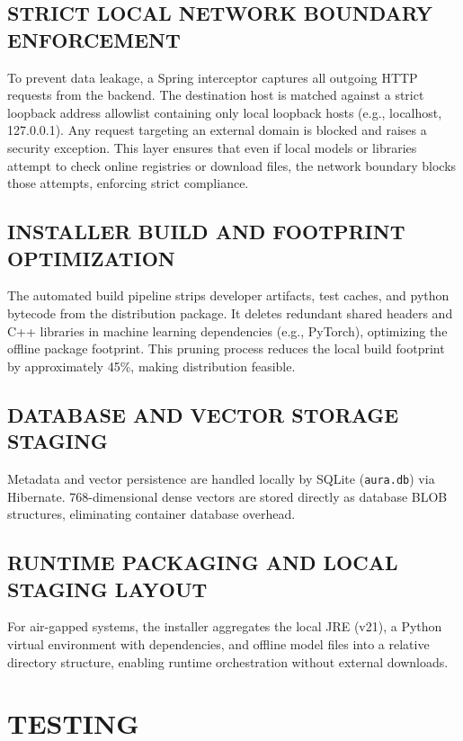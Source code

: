 \documentclass[12pt,a4paper]{report}
\begin{document}
\section{STRICT LOCAL NETWORK BOUNDARY ENFORCEMENT}
To prevent data leakage, a Spring interceptor captures all outgoing HTTP requests from the backend. The destination host is matched against a strict loopback address allowlist containing only local loopback hosts (e.g., localhost, 127.0.0.1). Any request targeting an external domain is blocked and raises a security exception. This layer ensures that even if local models or libraries attempt to check online registries or download files, the network boundary blocks those attempts, enforcing strict compliance.

\section{INSTALLER BUILD AND FOOTPRINT OPTIMIZATION}
The automated build pipeline strips developer artifacts, test caches, and python bytecode from the distribution package. It deletes redundant shared headers and C++ libraries in machine learning dependencies (e.g., PyTorch), optimizing the offline package footprint. This pruning process reduces the local build footprint by approximately 45\%, making distribution feasible.

\section{DATABASE AND VECTOR STORAGE STAGING}
Metadata and vector persistence are handled locally by SQLite (\texttt{aura.db}) via Hibernate. 768-dimensional dense vectors are stored directly as database BLOB structures, eliminating container database overhead.

\section{RUNTIME PACKAGING AND LOCAL STAGING LAYOUT}
For air-gapped systems, the installer aggregates the local JRE (v21), a Python virtual environment with dependencies, and offline model files into a relative directory structure, enabling runtime orchestration without external downloads.

\chapter{TESTING}
\label{ch:testing}
\end{document}
